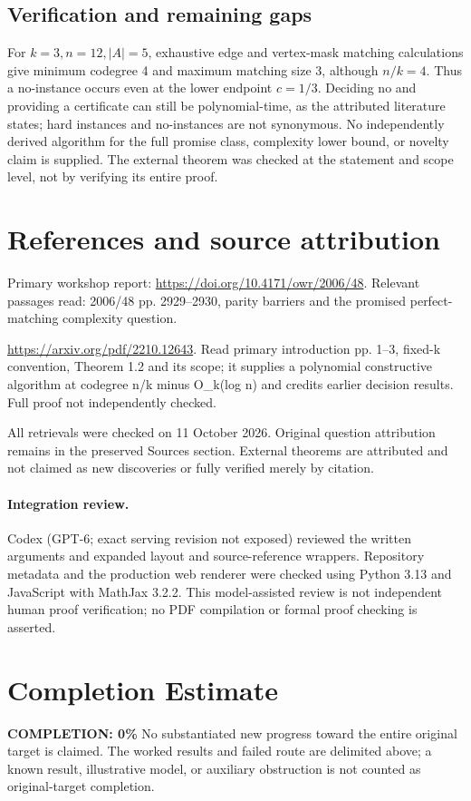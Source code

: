 \documentclass[11pt]{article}
\begin{document}
\subsection{Verification and remaining gaps}
For $k=3,n=12,|A|=5$, exhaustive edge and vertex-mask matching calculations give minimum codegree 4 and maximum matching size 3, although $n/k=4$. Thus a no-instance occurs even at the lower endpoint $c=1/3$. Deciding no and providing a certificate can still be polynomial-time, as the attributed literature states; hard instances and no-instances are not synonymous. No independently derived algorithm for the full promise class, complexity lower bound, or novelty claim is supplied. The external theorem was checked at the statement and scope level, not by verifying its entire proof.

\section{References and source attribution}
Primary workshop report: \url{https://doi.org/10.4171/owr/2006/48}. Relevant passages read: 2006/48 pp. 2929--2930, parity barriers and the promised perfect-matching complexity question.

\url{https://arxiv.org/pdf/2210.12643}. Read primary introduction pp. 1--3, fixed-k convention, Theorem 1.2 and its scope; it supplies a polynomial constructive algorithm at codegree n/k minus O_k(log n) and credits earlier decision results. Full proof not independently checked.

All retrievals were checked on 11 October 2026. Original question attribution remains in the preserved Sources section. External theorems are attributed and not claimed as new discoveries or fully verified merely by citation.


\paragraph{Integration review.} Codex (GPT-6; exact serving revision not exposed) reviewed the written arguments and expanded layout and source-reference wrappers. Repository metadata and the production web renderer were checked using Python 3.13 and JavaScript with MathJax 3.2.2. This model-assisted review is not independent human proof verification; no PDF compilation or formal proof checking is asserted.

\section{Completion Estimate}
\noindent\textbf{COMPLETION: 0\%}
No substantiated new progress toward the entire original target is claimed. The worked results and failed route are delimited above; a known result, illustrative model, or auxiliary obstruction is not counted as original-target completion.
\end{document}
